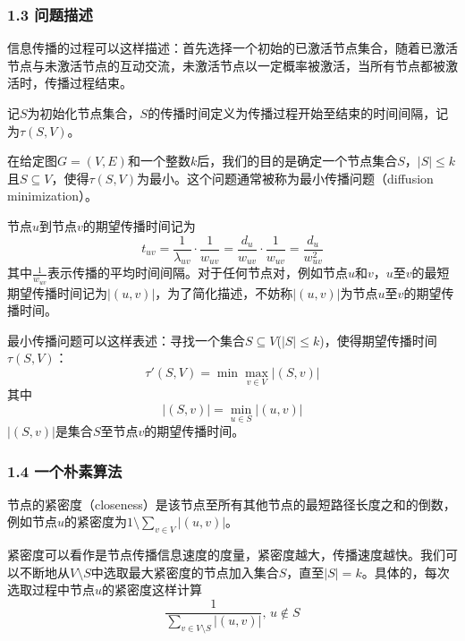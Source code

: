 \documentclass[UTF8]{ctexart}
\begin{document}
\subsubsection*{1.3 问题描述}
\par 信息传播的过程可以这样描述：首先选择一个初始的已激活节点集合，随着已激活节点与未激活节点的互动交流，未激活节点以一定概率被激活，当所有节点都被激活时，传播过程结束。
\par 记$S$为初始化节点集合，$S$的传播时间定义为传播过程开始至结束的时间间隔，记为$\tau (S,V)$。
\par 在给定图$G=(V,E)$和一个整数$k$后，我们的目的是确定一个节点集合$S$，$\left | S  \right |\leq k$且$S \subseteq V$，使得$\tau (S,V)$为最小。这个问题通常被称为最小传播问题（diffusion minimization）。
\par 节点$u$到节点$v$的期望传播时间记为
\begin{equation}
\label {equ:1}
t_{uv}=\frac {1}{\lambda_{uv}} \cdot \frac {1} {w_{uv}} = \frac {d_u}{w_{uv}} \cdot \frac {1}{w_{uv}}=\frac {d_u}{w^{2}_{uv}}
\end{equation}
其中$\frac {1}{w_{uv}}$表示传播的平均时间间隔。对于任何节点对，例如节点$u$和$v$，$u$至$v$的最短期望传播时间记为$\left | (u,v)  \right |$，为了简化描述，不妨称$\left | (u,v)  \right |$为节点$u$至$v$的期望传播时间。
\par 最小传播问题可以这样表述：寻找一个集合$S \subseteq V$($\left | S  \right |\leq k$)，使得期望传播时间$\tau (S,V)$：
\begin{equation}\tau'(S,V) = \min \max_{v \in V} \left | (S,v)  \right | \label{equ:2} \end{equation}
其中
\begin{equation}\left | (S,v)  \right | = \min_{u \in S} \left | (u,v)  \right | \label{equ:3}\end{equation}
$\left | (S,v)  \right |$是集合$S$至节点$v$的期望传播时间。
\subsubsection*{1.4 一个朴素算法}
\par 节点的紧密度（closeness）是该节点至所有其他节点的最短路径长度之和的倒数，例如节点$u$的紧密度为$1 \setminus \sum_{v \in V} \left | (u,v) \right |$。
\par 紧密度可以看作是节点传播信息速度的度量，紧密度越大，传播速度越快。我们可以不断地从$V\setminus S$中选取最大紧密度的节点加入集合$S$，直至$\left | S  \right |=k$。具体的，每次选取过程中节点$u$的紧密度这样计算
\begin{equation}\frac {1}{\sum_{v\in V \setminus S} \left | (u,v)  \right |}, \, u \notin S \label{equ:4}\end{equation}
\end{document}

